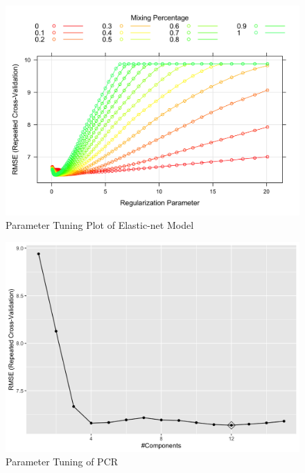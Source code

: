 \documentclass[
]{article}
\begin{document}
\begin{figure}
\centering
\includegraphics{report_figures/appendixB_figure1.png}
\caption{Parameter Tuning Plot of Elastic-net Model}
\end{figure}

\begin{figure}
\centering
\includegraphics{report_figures/appendixB_figure2.png}
\caption{Parameter Tuning of PCR}
\end{figure}
\end{document}
